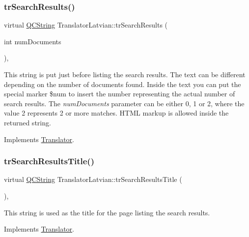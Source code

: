 \subsubsection{\texorpdfstring{trSearchResults()}{trSearchResults()}}
{\footnotesize\ttfamily virtual \mbox{\hyperlink{class_q_c_string}{Q\+C\+String}} Translator\+Latvian\+::tr\+Search\+Results (\begin{DoxyParamCaption}\item[{int}]{num\+Documents }\end{DoxyParamCaption})\hspace{0.3cm}{\ttfamily [inline]}, {\ttfamily [virtual]}}

This string is put just before listing the search results. The text can be different depending on the number of documents found. Inside the text you can put the special marker \$num to insert the number representing the actual number of search results. The {\itshape num\+Documents} parameter can be either 0, 1 or 2, where the value 2 represents 2 or more matches. H\+T\+ML markup is allowed inside the returned string. 

Implements \mbox{\hyperlink{class_translator}{Translator}}.

\mbox{\label{class_translator_latvian_a69715d6cd736ce17ac8476baf8bd0b44}} 
\subsubsection{\texorpdfstring{trSearchResultsTitle()}{trSearchResultsTitle()}}
{\footnotesize\ttfamily virtual \mbox{\hyperlink{class_q_c_string}{Q\+C\+String}} Translator\+Latvian\+::tr\+Search\+Results\+Title (\begin{DoxyParamCaption}{ }\end{DoxyParamCaption})\hspace{0.3cm}{\ttfamily [inline]}, {\ttfamily [virtual]}}

This string is used as the title for the page listing the search results. 

Implements \mbox{\hyperlink{class_translator}{Translator}}.

\mbox{\label{class_translator_latvian_a8ac0714fa779b7bbc19a2268a753185b}} 
